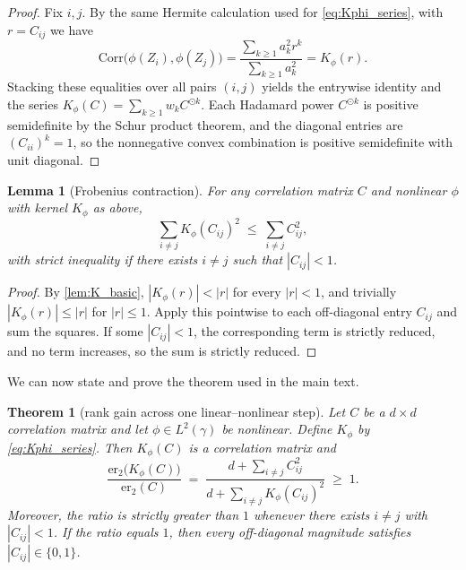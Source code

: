 \documentclass{article}
\newtheorem{theorem}{Theorem}[section]
\newtheorem{lemma}{Lemma}[section]
\numberwithin{figure}{section}
\begin{document}
\begin{proof}
Fix $i,j$. By the same Hermite calculation used for \eqref{eq:Kphi_series}, with $r=C_{ij}$ we have
\[
\mathrm{Corr}\big(\phi(Z_i),\phi(Z_j)\big)=\frac{\sum_{k\ge 1} a_k^2 r^k}{\sum_{k\ge 1} a_k^2}=K_\phi(r).
\]
Stacking these equalities over all pairs $(i,j)$ yields the entrywise identity and the series $K_\phi(C)=\sum_{k\ge 1} w_k C^{\odot k}$. Each Hadamard power $C^{\odot k}$ is positive semidefinite by the Schur product theorem, and the diagonal entries are $(C_{ii})^k=1$, so the nonnegative convex combination is positive semidefinite with unit diagonal.
\end{proof}

\begin{lemma}[Frobenius contraction]
\label{lem:fro_contract}
For any correlation matrix $C$ and nonlinear $\phi$ with kernel $K_\phi$ as above,
\[
\sum_{i\ne j} K_\phi(C_{ij})^2 \;\le\; \sum_{i\ne j} C_{ij}^2 ,
\]
with strict inequality if there exists $i\ne j$ such that $|C_{ij}|<1$.
\end{lemma}

\begin{proof}
By \cref{lem:K_basic}, $|K_\phi(r)|<|r|$ for every $|r|<1$, and trivially $|K_\phi(r)|\le |r|$ for $|r|\le 1$. Apply this pointwise to each off-diagonal entry $C_{ij}$ and sum the squares. If some $|C_{ij}|<1$, the corresponding term is strictly reduced, and no term increases, so the sum is strictly reduced.
\end{proof}

We can now state and prove the theorem used in the main text.

\begin{theorem}[rank gain across one linear–nonlinear step]
\label{prop:rank_gain_formal}
Let $C$ be a $d\times d$ correlation matrix and let $\phi\in L^2(\gamma)$ be nonlinear. Define $K_\phi$ by \eqref{eq:Kphi_series}. Then $K_\phi(C)$ is a correlation matrix and
\[
\frac{\mathrm{er}_2\big(K_\phi(C)\big)}{\mathrm{er}_2(C)}
\;=\; \frac{d+\sum_{i\ne j} C_{ij}^2}{d+\sum_{i\ne j} K_\phi(C_{ij})^2} \;\ge\; 1 .
\]
Moreover, the ratio is strictly greater than $1$ whenever there exists $i\ne j$ with $|C_{ij}|<1$. If the ratio equals $1$, then every off-diagonal magnitude satisfies $|C_{ij}|\in\{0,1\}$.
\end{theorem}
\end{document}
